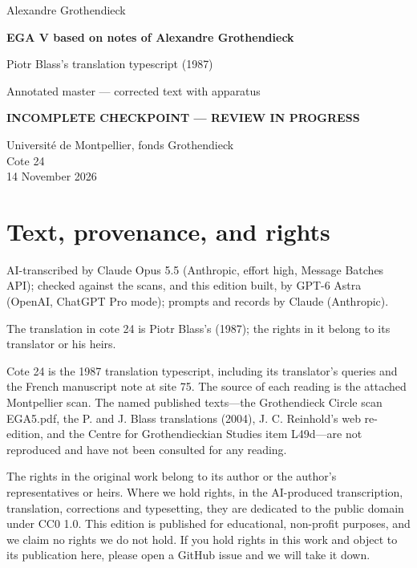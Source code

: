 \documentclass[10pt,a4paper]{article}
\newcommand{\EditionForm}{Annotated master — corrected text with apparatus}
\begin{document}
\hypersetup{pageanchor=false}\begin{titlepage}\thispagestyle{empty}\vspace*{20mm}
{\Large Alexandre Grothendieck\par}\vspace{12mm}
{\Huge\bfseries EGA V based on notes of Alexandre Grothendieck\par}\vspace{8mm}
{\Large Piotr Blass's translation typescript (1987)\par}\vspace{7mm}
{\large\EditionForm\par}\vspace{12mm}
{\large\bfseries\color{deletedred}INCOMPLETE CHECKPOINT — REVIEW IN PROGRESS\par}\vspace{10mm}
Université de Montpellier, fonds Grothendieck\\ Cote 24\\
14 November 2026
\vfill\end{titlepage}\clearpage\hypersetup{pageanchor=true}
\section*{Text, provenance, and rights}
AI-transcribed by Claude Opus 5.5 (Anthropic, effort high, Message Batches API); checked against the scans, and this edition built, by GPT-6 Astra (OpenAI, ChatGPT Pro mode); prompts and records by Claude (Anthropic).

The translation in cote 24 is Piotr Blass's (1987); the rights in it belong to its translator or his heirs.

Cote 24 is the 1987 translation typescript, including its translator's queries and the French manuscript note at site 75. The source of each reading is the attached Montpellier scan. The named published texts---the Grothendieck Circle scan EGA5.pdf, the P. and J. Blass translations (2004), J. C. Reinhold's web re-edition, and the Centre for Grothendieckian Studies item L49d---are not reproduced and have not been consulted for any reading.

The rights in the original work belong to its author or the author's representatives or heirs. Where we hold rights, in the AI-produced transcription, translation, corrections and typesetting, they are dedicated to the public domain under CC0 1.0. This edition is published for educational, non-profit purposes, and we claim no rights we do not hold. If you hold rights in this work and object to its publication here, please open a GitHub issue and we will take it down.
\end{document}
